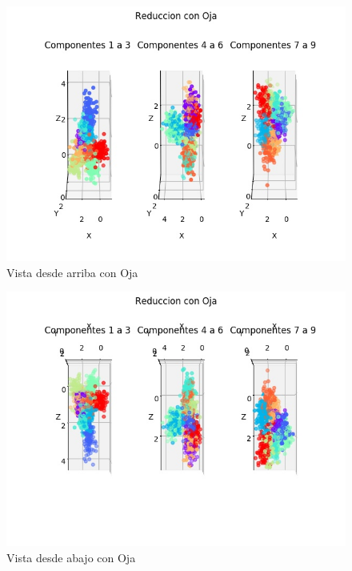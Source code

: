 \begin{figure}[H]
  \includegraphics[width=160mm]{imagenes/reduccion_Oja_1.jpg}
  \caption{Vista desde arriba con Oja}
\end{figure}

\begin{figure}[H]
  \includegraphics[width=160mm]{imagenes/reduccion_Oja_2.jpg}
  \caption{Vista desde abajo con Oja}
\end{figure}

